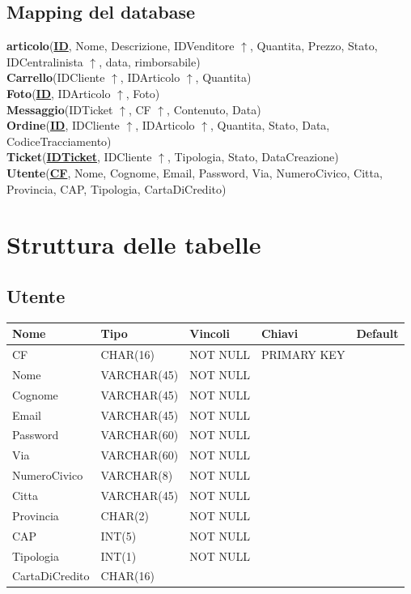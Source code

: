\documentclass[12pt,a4paper]{article}
\begin{document}
\subsection{Mapping del database}
\textbf{articolo}(\underline{\textbf{ID}}, Nome, Descrizione, IDVenditore $\uparrow$, Quantita, Prezzo, Stato, IDCentralinista $\uparrow$, data, rimborsabile) \\
\textbf{Carrello}(IDCliente $\uparrow$, IDArticolo $\uparrow$, Quantita) \\
\textbf{Foto}(\underline{\textbf{ID}}, IDArticolo $\uparrow$, Foto) \\
\textbf{Messaggio}(IDTicket $\uparrow$, CF $\uparrow$, Contenuto, Data) \\
\textbf{Ordine}(\underline{\textbf{ID}}, IDCliente $\uparrow$, IDArticolo $\uparrow$, Quantita, Stato, Data, CodiceTracciamento)\\
\textbf{Ticket}(\underline{\textbf{IDTicket}}, IDCliente $\uparrow$, Tipologia, Stato, DataCreazione) \\
\textbf{Utente}(\underline{\textbf{CF}}, Nome, Cognome, Email, Password, Via, NumeroCivico, Citta, Provincia, CAP, Tipologia, CartaDiCredito)

\section{Struttura delle tabelle}

\subsection{Utente}
\begin{center}
\begin{tabular}{|l|l|l|l|l|}
\hline
\rowcolor[HTML]{C0C0C0} 
\textbf{Nome} & \textbf{Tipo} & \textbf{Vincoli} & \textbf{Chiavi} & \textbf{Default}  \\ \hline
CF & CHAR(16) & NOT NULL & PRIMARY KEY &  \\ \hline
Nome & VARCHAR(45) & NOT NULL & & \\ \hline
Cognome & VARCHAR(45) & NOT NULL & & \\ \hline
Email & VARCHAR(45) & NOT NULL & & \\ \hline
Password & VARCHAR(60) & NOT NULL & & \\ \hline
Via & VARCHAR(60) & NOT NULL & & \\ \hline
NumeroCivico & VARCHAR(8) & NOT NULL & & \\ \hline
Citta & VARCHAR(45) & NOT NULL & & \\ \hline
Provincia & CHAR(2) & NOT NULL & & \\ \hline
CAP & INT(5) & NOT NULL && \\ \hline
Tipologia & INT(1) & NOT NULL && \\ \hline
CartaDiCredito & CHAR(16) &&& \\ \hline
\end{tabular}
\end{center}
\end{document}
